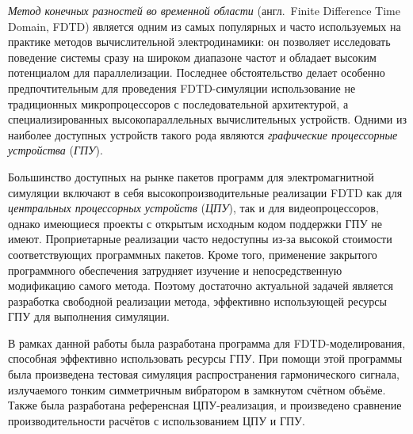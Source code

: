 
\textit{Метод конечных разностей во временной области} (англ.~Finite Difference Time Domain, FDTD) является одним из самых популярных и часто используемых на практике методов вычислительной электродинамики: он позволяет исследовать поведение системы сразу на широком диапазоне частот и обладает высоким потенциалом для параллелизации. Последнее обстоятельство делает особенно предпочтительным для проведения FDTD-симуляции использование не традиционных микропроцессоров с последовательной архитектурой, а специализированных высокопараллельных вычислительных устройств. Одними из наиболее доступных устройств такого рода являются \textit{графические процессорные устройства} (\textit{ГПУ}).

Большинство доступных на рынке пакетов программ для электромагнитной симуляции включают в себя высокопроизводительные реализации FDTD как для \textit{центральных процессорных устройств} (\textit{ЦПУ}), так и для видеопроцессоров, однако имеющиеся проекты с открытым исходным кодом поддержки ГПУ не имеют. Проприетарные реализации часто недоступны из-за высокой стоимости соответствующих программных пакетов. Кроме того, применение закрытого программного обеспечения затрудняет изучение и непосредственную модификацию самого метода. Поэтому достаточно актуальной задачей является разработка свободной реализации метода, эффективно использующей ресурсы ГПУ для выполнения симуляции.

В рамках данной работы была разработана программа для FDTD-моделирования, способная эффективно использовать ресурсы ГПУ. При помощи этой программы была произведена тестовая симуляция распространения гармонического сигнала, излучаемого тонким симметричным вибратором в замкнутом счётном объёме. Также была разработана референсная ЦПУ-реализация, и произведено сравнение производительности расчётов с использованием ЦПУ и ГПУ.

\clearpage